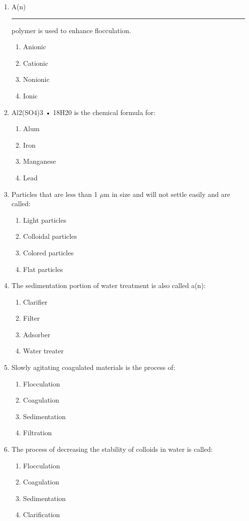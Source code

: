 \begin{enumerate}
\item A(n) \rule{2cm}{0.3pt} polymer is used to enhance flocculation.
\begin{enumerate}
\item Anionic
\item Cationic
\item Nonionic
\item Ionic
\end{enumerate}

\item Al2(SO4)3 • 18H20 is the chemical formula for:
\begin{enumerate}
\item Alum
\item Iron
\item Manganese
\item Lead
\end{enumerate}

\item Particles that are less than 1 $\mu$m in size and will not settle easily and are called:
\begin{enumerate}
\item Light particles
\item Colloidal particles
\item Colored particles
\item Flat particles
\end{enumerate}

\item The sedimentation portion of water treatment is also called a(n):
\begin{enumerate}
\item Clarifier
\item Filter
\item Adsorber
\item Water treater
\end{enumerate}

\item Slowly agitating coagulated materials is the process of:
\begin{enumerate}
\item Flocculation
\item Coagulation
\item Sedimentation
\item Filtration
\end{enumerate}

\item The process of decreasing the stability of colloids in water is called:
\begin{enumerate}
\item Flocculation
\item Coagulation
\item Sedimentation
\item Clarification
\end{enumerate}


\end{enumerate}

